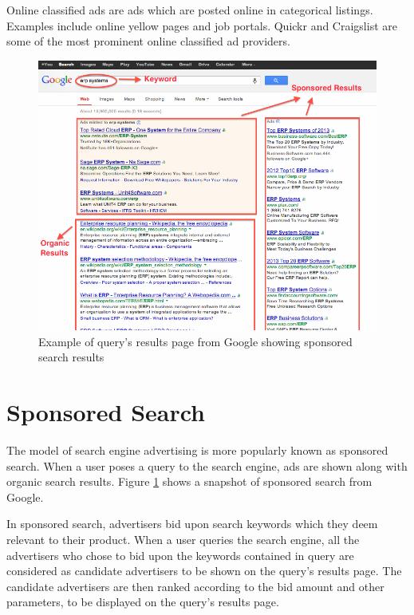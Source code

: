 Online classified ads are ads which are posted online in categorical listings. Examples include online yellow pages and job portals. Quickr and Craigslist are some of the most prominent online classified ad providers.


\begin{figure}
	\centering
\includegraphics[scale=0.4]{visuals/ss_example.png}
	\caption{Example of query's results page from Google showing sponsored search results}
	\label{fig:ss_example}
\end{figure}


\section{Sponsored Search}

The model of search engine advertising is more popularly known as sponsored search. When a user poses a query to the search engine, ads are shown along with organic search results. Figure \ref{fig:ss_example} shows a snapshot of sponsored search from Google.


In sponsored search, advertisers bid upon search keywords which they deem relevant to their product. When a user queries the search engine, all the advertisers who chose to bid upon the keywords contained in query are considered as candidate advertisers to be shown on the query's results page. The candidate advertisers are then ranked according to the bid amount and other parameters, to be displayed on the query's results page.



